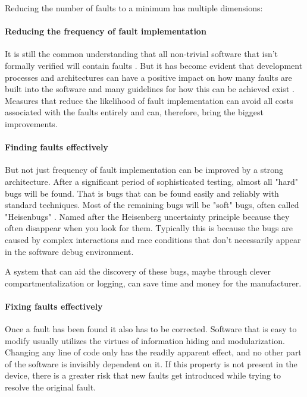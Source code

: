 Reducing the number of faults to a minimum has multiple dimensions:
\paragraph{Reducing the frequency of fault implementation}
It is still the common understanding that all non-trivial software that isn't formally verified will contain faults \cite{klein2009sel4}\cite{lipow1982number}. But it has become evident that development processes and architectures can have a positive impact on how many faults are built into the software and many guidelines for how this can be achieved exist \cite{martin2009clean}. Measures that reduce the likelihood of fault implementation can avoid all costs associated with the faults entirely and can, therefore, bring the biggest improvements. 
\paragraph{Finding faults effectively}
But not just frequency of fault implementation can be improved by a strong architecture. After a significant period of sophisticated testing, almost all "hard" bugs will be found. That is bugs that can be found easily and reliably with standard techniques. Most of the remaining bugs will be "soft" bugs, often called "Heisenbugs" \cite{gray1986computers}. Named after the Heisenberg uncertainty principle because they often disappear when you look for them. Typically this is because the bugs are caused by complex interactions and race conditions that don't necessarily appear in the software debug environment.

A system that can aid the discovery of these bugs, maybe through clever compartmentalization or logging, can save time and money for the manufacturer.
\paragraph{Fixing faults effectively}
Once a fault has been found it also has to be corrected. Software that is easy to modify usually utilizes the virtues of information hiding and modularization. Changing any line of code only has the readily apparent effect, and no other part of the software is invisibly dependent on it. If this property is not present in the device, there is a greater risk that new faults get introduced while trying to resolve the original fault. 

